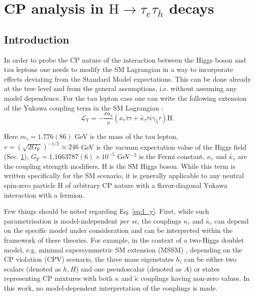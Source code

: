 \chapter{CP analysis in $\text{H} \to \tau_e\tau_h$ decays}
\section{Introduction}\label{sec:cp-intro}

In order to probe the CP nature of the interaction between the Higgs boson and tau leptons one needs to modify the SM Lagrangian in a way to incorporate effects deviating from the Standard Model expectations. This can be done already at the tree level and from the general assumptions, i.e. without assuming any model dependence. For the tau lepton case one can write the following extension of the Yukawa coupling term in the SM Lagrangian \cite{Gritsan:2016hjl}:
\begin{equation}\label{eq:l_y}
    \mathcal{L}_Y = -\frac{m_\tau}{v}(\kappa_\tau\bar{\tau}\tau + \tilde{\kappa_\tau}\bar{\tau}i\gamma_5\tau) \text{H}.
\end{equation}

Here $m_\tau = 1.776(86)$ GeV is the mass of the tau lepton, $v=\left(\sqrt{2G_\text{F}}\right)^{-1/2} \approx 246$ GeV is the vacuum expectation value of the Higgs field (Sec. \ref{}), $G_\text{F} = 1.1663787(6) × 10^{−5}$ GeV$^{-2}$ is the Fermi constant, $\kappa_\tau$ and $\tilde{\kappa_\tau}$ are the coupling strength
modifiers, H is the SM Higgs boson. While this term is written specifically for the SM scenario, it is generally applicable to any neutral spin-zero particle H of arbitrary CP nature with a flavor-diagonal Yukawa interaction with a fermion. 

Few things should be noted regarding Eq. \ref{eq:l_y}. First, while such parametrisation is model-independent \textit{per se}, the couplings $\kappa_\tau$ and $\tilde{\kappa_\tau}$ can depend on the specific model under consideration and can be interpreted within the framework of these theories. For example, in the context of a two-Higgs doublet model, e.g. minimal supersymmetric SM
extension (MSSM) \cite{Accomando:2006ga}, depending on the CP violation (CPV) scenario, the three mass eigenstates $h_i$ can be either two scalars (denoted as $h, H$) and one pseudoscalar (denoted as $A$) or states representing CP mixtures with both $\kappa$ and $\tilde{\kappa}$ couplings having non-zero values. In this work, no model-dependent interpretation of the couplings is made.    

